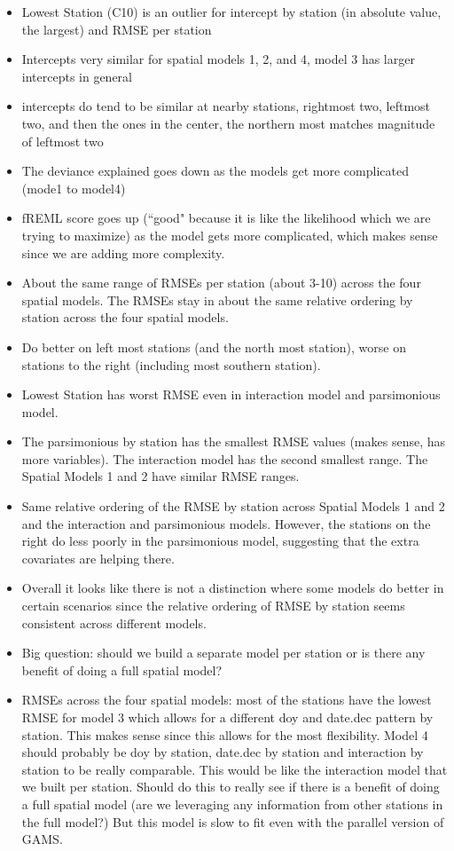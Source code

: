 \documentclass[12pt]{amsart}
\begin{document}
\begin{itemize}
\item Lowest Station (C10) is an outlier for intercept by station (in absolute value, the largest) and RMSE per station
\item Intercepts very similar for spatial models 1, 2, and 4, model 3 has larger intercepts in general
\item intercepts do tend to be similar at nearby stations, rightmost two, leftmost two, and then the ones in the center, the northern most matches magnitude of leftmost two
\item The deviance explained goes down as the models get more complicated (mode1 to model4)
\item fREML score goes up (``good" because it is like the likelihood which we are trying to maximize) as the model gets more complicated, which makes sense since we are adding more complexity.
\item About the same range of RMSEs per station (about 3-10) across the four spatial models. The RMSEs stay in about the same relative ordering by station across the four spatial models.
\item Do better on left most stations (and the north most station), worse on stations to the right (including most southern station). 
\item Lowest Station has worst RMSE even in interaction model and parsimonious model.
\item The parsimonious by station has the smallest RMSE values (makes sense, has more variables). The interaction model has the second smallest range. The Spatial Models 1 and 2 have similar RMSE ranges.
\item Same relative ordering of the RMSE by station across Spatial Models 1 and 2 and the interaction and parsimonious models. However, the stations on the right do less poorly in the parsimonious model, suggesting that the extra covariates are helping there.
\item Overall it looks like there is not a distinction where some models do better in certain scenarios since the relative ordering of RMSE by station seems consistent across different models. 
\item Big question: should we build a separate model per station or is there any benefit of doing a full spatial model?
\item RMSEs across the four spatial models: most of the stations have the lowest RMSE for model 3 which allows for a different doy and date.dec pattern by station. This makes sense since this allows for the most flexibility. Model 4 should probably be doy by station, date.dec by station and interaction by station to be really comparable. This would be like the interaction model that we built per station. Should do this to really see if there is a benefit of doing a full spatial model (are we leveraging any information from other stations in the full model?) But this model is slow to fit even with the parallel version of GAMS.

\end{itemize}
\end{document}
